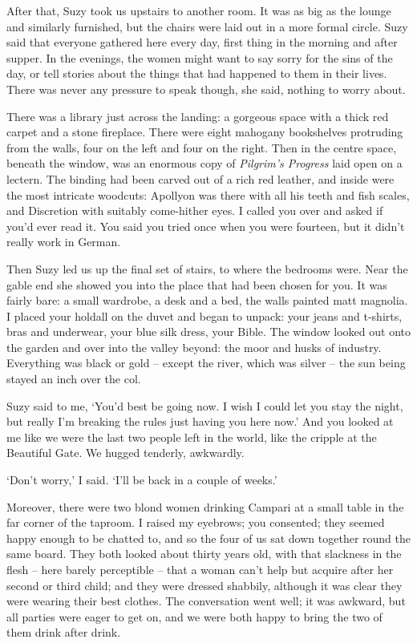 After that, Suzy took us upstairs to another room. It was as big as the lounge and similarly furnished, but the chairs were laid out in a more formal circle. Suzy said that everyone gathered here every day, first thing in the morning and after supper. In the evenings, the women might want to say sorry for the sins of the day, or tell stories about the things that had happened to them in their lives. There was never any pressure to speak though, she said, nothing to worry about.

There was a library just across the landing: a gorgeous space with a thick red carpet and a stone fireplace. There were eight mahogany bookshelves protruding from the walls, four on the left and four on the right. Then in the centre space, beneath the window, was an enormous copy of \emph{Pilgrim's Progress} laid open on a lectern. The binding had been carved out of a rich red leather, and inside were the most intricate woodcuts: Apollyon was there with all his teeth and fish scales, and Discretion with suitably come-hither eyes. I called you over and asked if you'd ever read it. You said you tried once when you were fourteen, but it didn't really work in German.

Then Suzy led us up the final set of stairs, to where the bedrooms were. Near the gable end she showed you into the place that had been chosen for you. It was fairly bare: a small wardrobe, a desk and a bed, the walls painted matt magnolia. I placed your holdall on the duvet and began to unpack: your jeans and t-shirts, bras and underwear, your blue silk dress, your Bible. The window looked out onto the garden and over into the valley beyond: the moor and husks of industry. Everything was black or gold -- except the river, which was silver -- the sun being stayed an inch over the col.

Suzy said to me, `You'd best be going now. I wish I could let you stay the night, but really I'm breaking the rules just having you here now.' And you looked at me like we were the last two people left in the world, like the cripple at the Beautiful Gate. We hugged tenderly, awkwardly.

`Don't worry,' I said. `I'll be back in a couple of weeks.'

\prosesep

Moreover, there were two blond women drinking Campari at a small table in the far corner of the taproom. I raised my eyebrows; you consented; they seemed happy enough to be chatted to, and so the four of us sat down together round the same board. They both looked about thirty years old, with that slackness in the flesh -- here barely perceptible -- that a woman can't help but acquire after her second or third child; and they were dressed shabbily, although it was clear they were wearing their best clothes. The conversation went well; it was awkward, but all parties were eager to get on, and we were both happy to bring the two of them drink after drink.

